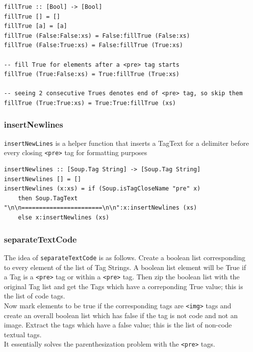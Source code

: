 \documentclass[12pt]{scrreprt}
\newcommand{\ttt}[1]{\texttt{#1}}
\begin{document}
\begin{verbatim}
fillTrue :: [Bool] -> [Bool]
fillTrue [] = []
fillTrue [a] = [a]
fillTrue (False:False:xs) = False:fillTrue (False:xs)
fillTrue (False:True:xs) = False:fillTrue (True:xs)

-- fill True for elements after a <pre> tag starts
fillTrue (True:False:xs) = True:fillTrue (True:xs) 

-- seeing 2 consecutive Trues denotes end of <pre> tag, so skip them
fillTrue (True:True:xs) = True:True:fillTrue (xs) 
\end{verbatim}







\subsubsection{insertNewlines}
\texttt{insertNewLines} is a helper function that inserts a TagText for a delimiter before every closing \texttt{<pre>} tag for formatting purposes 

\begin{verbatim}
insertNewlines :: [Soup.Tag String] -> [Soup.Tag String]
insertNewlines [] = []
insertNewlines (x:xs) = if (Soup.isTagCloseName "pre" x)
    then Soup.TagText "\n\n=======================\n\n":x:insertNewlines (xs)
    else x:insertNewlines (xs)
\end{verbatim}


\subsubsection{separateTextCode}
The idea of \texttt{separateTextCode} is as follows. Create a boolean list corresponding to every element of the list of Tag Strings. A boolean list element will be True if a Tag is a \texttt{<pre>} tag or within a \texttt{<pre>} tag. Then zip the boolean list with the original Tag list and get the Tags which have a correponding True value; this is the list of code tags. \\ Now mark elements to be true if the corresponding tags are \texttt{<img>} tags and create an overall boolean list which has false if the tag is not code and not an image. Extract the tags which have a false value; this is the list of non-code textual tags. \\ It essentially solves the parenthesization problem with the \ttt{<pre>} tags.
\end{document}
